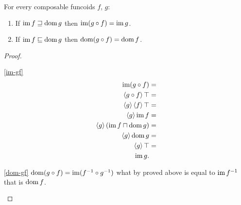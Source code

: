 \begin{prop}
For every composable funcoids $f$, $g$:
\begin{enumerate}
\item \label{im-gf}If $\im f\sqsupseteq\dom g$ then $\im(g\circ f)=\im g$.
\item \label{dom-gf}If $\im f\sqsubseteq\dom g$ then $\dom(g\circ f)=\dom f$.
\end{enumerate}
\end{prop}
\begin{proof}
~
\begin{widedisorder}
\item [{\ref{im-gf}}] ~
\begin{align*}
\im(g\circ f) & =\\
\supfun{g\circ f}\top & =\\
\supfun g\supfun f\top & =\\
\supfun g\im f & =\\
\supfun g(\im f\sqcap\dom g) & =\\
\supfun g\dom g & =\\
\supfun g\top & =\\
\im g.
\end{align*}

\item [{\ref{dom-gf}}] $\dom(g\circ f)=\im(f^{-1}\circ g^{-1})$ what
by proved above is equal to $\im f^{-1}$ that is $\dom f$.
\end{widedisorder}
\end{proof}
